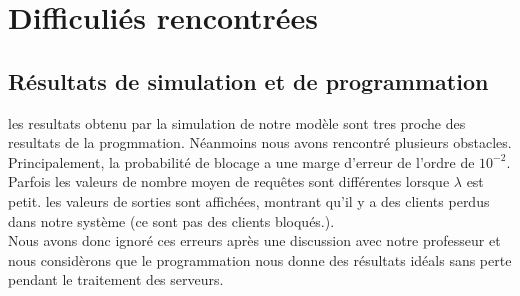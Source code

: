 \section{Difficuli\'es rencontr\'ees}

\subsection{Résultats de simulation et de programmation}

\noindent 
les resultats obtenu par la simulation de notre modèle sont tres proche des resultats de la progmmation. Néanmoins nous avons rencontré plusieurs obstacles. Principalement, la probabilité de blocage a une marge d'erreur de l'ordre de $ 10^{-2} $. Parfois les valeurs de nombre moyen de requêtes sont différentes lorsque $\lambda$ est petit.
les valeurs de sorties sont affichées, montrant qu'il y a des clients perdus dans notre système (ce sont pas des clients bloqués.). 
\\
\noindent Nous avons donc ignoré ces erreurs après une discussion avec notre professeur et nous considèrons que le programmation nous donne des résultats idéals sans perte pendant le traitement des serveurs.
